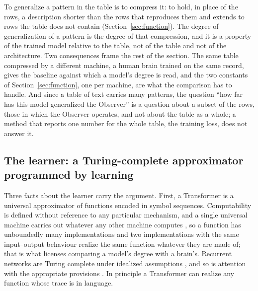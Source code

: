 To generalize a pattern in the table is to compress it: to hold, in place of the rows, a description
shorter than the rows that reproduces them and extends to rows the table does not contain
(Section~\ref{sec:function}). The degree of generalization of a pattern is the degree of that
compression, and it is a property of the trained model relative to the table, not of the table and not
of the architecture. Two consequences frame the rest of the section. The same table compressed by a
different machine, a human brain trained on the same record, gives the baseline against which a
model's degree is read, and the two constants of Section~\ref{sec:function}, one per machine, are what
the comparison has to handle. And since a table of text carries many patterns, the question ``how far
has this model generalized the Observer'' is a question about a subset of the rows, those in which the
Observer operates, and not about the table as a whole; a method that reports one number for the whole
table, the training loss, does not answer it.

\subsection{The learner: a Turing-complete approximator programmed by learning}
\label{sec:transformer}
\label{sec:formalism}
\label{sec:generalize}

Three facts about the learner carry the argument. First, a Transformer is a universal approximator of
functions encoded in symbol sequences. Computability is defined without reference to any particular
mechanism, and a single universal machine carries out whatever any other machine computes
\citep[\S 6--7]{turing1936}, so a function has unboundedly many implementations and two
implementations with the same input--output behaviour realize the same function whatever they are
made of; that is what licenses comparing a model's degree with a brain's. Recurrent networks are
Turing complete under idealized assumptions \citep{siegelmann1995}, and so is attention with the
appropriate provisions \citep{perez2021}. In principle a Transformer can realize any function whose
trace is in language.

